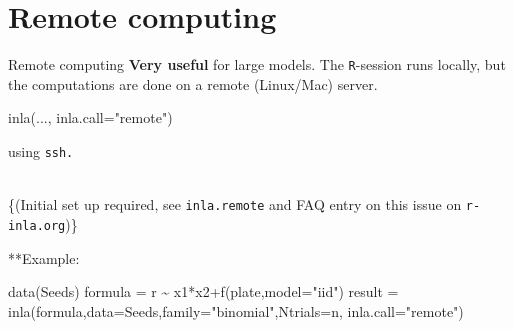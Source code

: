 \documentclass[
  ignorenonframetext,
]{beamer}
\newenvironment{Shaded}{\begin{snugshade}}{\end{snugshade}}
\newcommand{\AttributeTok}[1]{\textcolor[rgb]{0.77,0.63,0.00}{#1}}
\newcommand{\FunctionTok}[1]{\textcolor[rgb]{0.00,0.00,0.00}{#1}}
\newcommand{\NormalTok}[1]{#1}
\newcommand{\OtherTok}[1]{\textcolor[rgb]{0.56,0.35,0.01}{#1}}
\newcommand{\SpecialCharTok}[1]{\textcolor[rgb]{0.00,0.00,0.00}{#1}}
\newcommand{\StringTok}[1]{\textcolor[rgb]{0.31,0.60,0.02}{#1}}
\begin{document}
\hypertarget{remote-computing}{%
\section{Remote computing}\label{remote-computing}}

\begin{frame}[fragile]{Remote computing}
\protect\hypertarget{remote-computing-1}{}
\textbf{Very useful} for large models. The \texttt{R}-session runs
locally, but the computations are done on a remote (Linux/Mac) server.\\

\begin{Shaded}
\begin{Highlighting}[]
\FunctionTok{inla}\NormalTok{(..., }\AttributeTok{inla.call=}\StringTok{"remote"}\NormalTok{)}
\end{Highlighting}
\end{Shaded}

using \texttt{ssh.}\\
\strut \\
\{\scriptsize (Initial set up required, see \texttt{inla.remote} and FAQ
entry on this issue on \texttt{r-inla.org})\}

**Example: \tiny

\begin{Shaded}
\begin{Highlighting}[]
\FunctionTok{data}\NormalTok{(Seeds)}
\NormalTok{formula }\OtherTok{=}\NormalTok{ r }\SpecialCharTok{\textasciitilde{}}\NormalTok{ x1}\SpecialCharTok{*}\NormalTok{x2}\SpecialCharTok{+}\FunctionTok{f}\NormalTok{(plate,}\AttributeTok{model=}\StringTok{"iid"}\NormalTok{)}
\NormalTok{result }\OtherTok{=} \FunctionTok{inla}\NormalTok{(formula,}\AttributeTok{data=}\NormalTok{Seeds,}\AttributeTok{family=}\StringTok{"binomial"}\NormalTok{,}\AttributeTok{Ntrials=}\NormalTok{n, }\AttributeTok{inla.call=}\StringTok{"remote"}\NormalTok{)}
\end{Highlighting}
\end{Shaded}

\normalsize
\end{frame}
\end{document}
